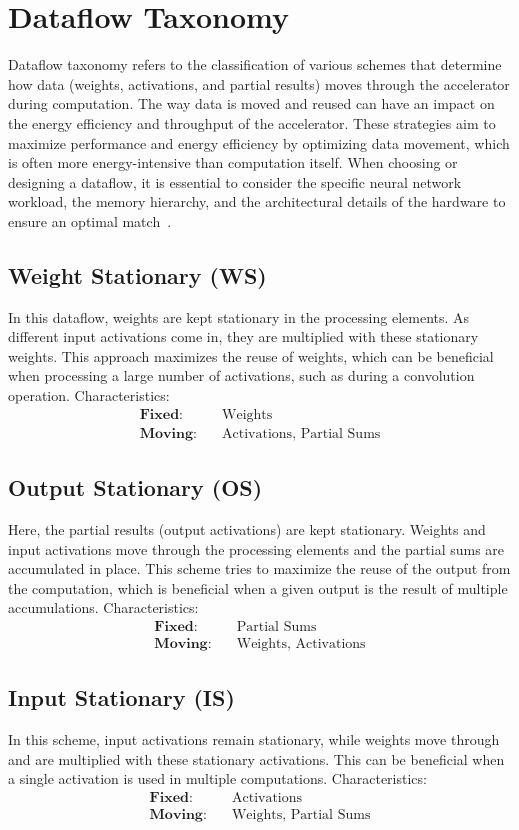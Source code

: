 \section{Dataflow Taxonomy}
Dataflow taxonomy refers to the classification of various schemes that determine how data (weights, activations, and partial results) moves through the accelerator during computation. The way data is moved and reused can have an impact on the energy efficiency and throughput of the accelerator. These strategies aim to maximize performance and energy efficiency by optimizing data movement, which is often more energy-intensive than computation itself. When choosing or designing a dataflow, it is essential to consider the specific neural network workload, the memory hierarchy, and the architectural details of the hardware to ensure an optimal match~\cite{sze2017efficient}.

\subsection*{Weight Stationary (WS)}
In this dataflow, weights are kept stationary in the processing elements. As different input activations come in, they are multiplied with these stationary weights. This approach maximizes the reuse of weights, which can be beneficial when processing a large number of activations, such as during a convolution operation.
Characteristics:
\begin{align*}
\textbf{Fixed:} & \quad \text{Weights} \\
\textbf{Moving:} & \quad \text{Activations, Partial Sums}
\end{align*}

\subsection*{Output Stationary (OS)}
Here, the partial results (output activations) are kept stationary. Weights and input activations move through the processing elements and the partial sums are accumulated in place. This scheme tries to maximize the reuse of the output from the computation, which is beneficial when a given output is the result of multiple accumulations. Characteristics:
\begin{align*}
\textbf{Fixed:} & \quad \text{Partial Sums} \\
\textbf{Moving:} & \quad \text{Weights, Activations}
\end{align*}

\subsection*{Input Stationary (IS)}
In this scheme, input activations remain stationary, while weights move through and are multiplied with these stationary activations. This can be beneficial when a single activation is used in multiple computations. Characteristics:
\begin{align*}
\textbf{Fixed:} & \quad \text{Activations} \\
\textbf{Moving:} & \quad \text{Weights, Partial Sums}
\end{align*}

